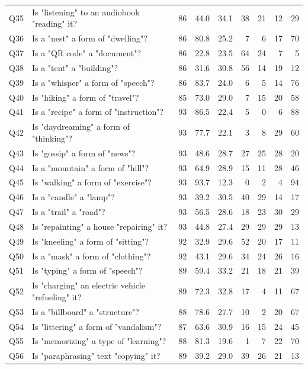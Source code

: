 \begin{scriptsize}
\begin{longtable}{lp{}rrrrrrr}
Q35 & Is "listening" to an audiobook "reading" it? & 86 & 44.0 & 34.1 & 38 & 21 & 12 & 29 \\
Q36 & Is a "nest" a form of "dwelling"? & 86 & 80.8 & 25.2 & 7 & 6 & 17 & 70 \\
Q37 & Is a "QR code" a "document"? & 86 & 22.8 & 23.5 & 64 & 24 & 7 & 5 \\
Q38 & Is a "tent" a "building"? & 86 & 31.6 & 30.8 & 56 & 14 & 19 & 12 \\
Q39 & Is a "whisper" a form of "speech"? & 86 & 83.7 & 24.0 & 6 & 5 & 14 & 76 \\
Q40 & Is "hiking" a form of "travel"? & 85 & 73.0 & 29.0 & 7 & 15 & 20 & 58 \\
Q41 & Is a "recipe" a form of "instruction"? & 93 & 86.5 & 22.4 & 5 & 0 & 6 & 88 \\
Q42 & Is "daydreaming" a form of "thinking"? & 93 & 77.7 & 22.1 & 3 & 8 & 29 & 60 \\
Q43 & Is "gossip" a form of "news"? & 93 & 48.6 & 28.7 & 27 & 25 & 28 & 20 \\
Q44 & Is a "mountain" a form of "hill"? & 93 & 64.9 & 28.9 & 15 & 11 & 28 & 46 \\
Q45 & Is "walking" a form of "exercise"? & 93 & 93.7 & 12.3 & 0 & 2 & 4 & 94 \\
Q46 & Is a "candle" a "lamp"? & 93 & 39.2 & 30.5 & 40 & 29 & 14 & 17 \\
Q47 & Is a "trail" a "road"? & 93 & 56.5 & 28.6 & 18 & 23 & 30 & 29 \\
Q48 & Is "repainting" a house "repairing" it? & 93 & 44.8 & 27.4 & 29 & 29 & 29 & 13 \\
Q49 & Is "kneeling" a form of "sitting"? & 92 & 32.9 & 29.6 & 52 & 20 & 17 & 11 \\
Q50 & Is a "mask" a form of "clothing"? & 92 & 43.1 & 29.6 & 34 & 24 & 26 & 16 \\
Q51 & Is "typing" a form of "speech"? & 89 & 59.4 & 33.2 & 21 & 18 & 21 & 39 \\
Q52 & Is "charging" an electric vehicle "refueling" it? & 89 & 72.3 & 32.8 & 17 & 4 & 11 & 67 \\
Q53 & Is a "billboard" a "structure"? & 88 & 78.6 & 27.7 & 10 & 2 & 20 & 67 \\
Q54 & Is "littering" a form of "vandalism"? & 87 & 63.6 & 30.9 & 16 & 15 & 24 & 45 \\
Q55 & Is "memorizing" a type of "learning"? & 88 & 81.3 & 19.6 & 1 & 7 & 22 & 70 \\
Q56 & Is "paraphrasing" text "copying" it? & 89 & 39.2 & 29.0 & 39 & 26 & 21 & 13 \\

\end{longtable}
\end{scriptsize}
